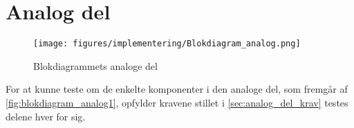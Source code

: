 \section{Analog del}
\begin{figure}[H]
\centering
\texttt{[image: figures/implementering/Blokdiagram\_analog.png]}
\caption{Blokdiagrammets analoge del}
\label{fig:blokdiagram_analog1}
\end{figure}


For at kunne teste om de enkelte komponenter i den analoge del, som fremgår af \autoref{fig:blokdiagram_analog1}, opfylder kravene stillet i \autoref{sec:analog_del_krav} testes delene hver for sig.